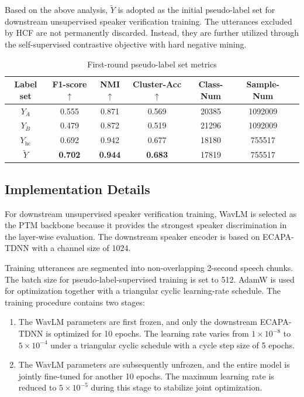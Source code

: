 \documentclass[lettersize,journal]{IEEEtran}
\begin{document}
Based on the above analysis, $\tilde{Y}$ is adopted as the initial
pseudo-label set for downstream unsupervised speaker verification
training. The utterances excluded by HCF are not permanently
discarded. Instead, they are further utilized through the
self-supervised contrastive objective with hard negative mining.


\begin{table}[!t] %
    \centering
    \caption{First-round pseudo-label set metrics} %
    \setlength{\tabcolsep}{4pt} %
    \begin{tabular}{c c c c c c c} %
        \hline
        Label set  & F1-score$\uparrow$ & NMI$\uparrow$ & Cluster-Acc$\uparrow$ & Class-Num & Sample-Num \\
        \hline
        $Y_A$    & 0.555 & 0.871 & 0.569  & 20385  &1092009  \\    
        $Y_B$      & 0.479  & 0.872 & 0.519 & 21296 & 1092009  \\         
        $Y_{\mathrm{hc}}$      & 0.692 & 0.942 & 0.677  & 18180   & 755517   \\
        $\tilde{Y}$     & \textbf{0.702} & \textbf{0.944} & \textbf{0.683} &  17819  &  755517     \\
        \hline
    \end{tabular}
    \label{tab:First-round pseudo-label set metrics}
\end{table}
\subsection{Implementation Details}

For downstream unsupervised speaker verification training, WavLM is
selected as the PTM backbone because it provides the strongest
speaker discrimination in the layer-wise evaluation. The downstream
speaker encoder is based on ECAPA-TDNN with a channel size of 1024.

Training utterances are segmented into non-overlapping 2-second
speech chunks. The batch size for pseudo-label-supervised training is
set to 512. AdamW is used for optimization together with a
triangular cyclic learning-rate schedule. The training procedure
contains two stages:

\begin{enumerate}
    \item The WavLM parameters are first frozen, and only the
    downstream ECAPA-TDNN is optimized for 10 epochs. The learning
    rate varies from $1\times10^{-8}$ to $5\times10^{-4}$ under a
    triangular cyclic schedule with a cycle step size of 5 epochs.

    \item The WavLM parameters are subsequently unfrozen, and the
    entire model is jointly fine-tuned for another 10 epochs. The
    maximum learning rate is reduced to $5\times10^{-5}$ during this
    stage to stabilize joint optimization.
\end{enumerate}
\end{document}
